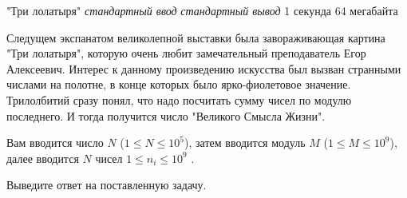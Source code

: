 \begin{problem}%
{"Три лолатыря"}%
{\textsl{стандартный ввод}}%
{\textsl{стандартный вывод}}%
{1 секунда}%
{64 мегабайта}{}

Следущем экспанатом великолепной выставки была завораживающая картина "Три лолатыря", которую очень любит замечательный преподаватель Егор Алексеевич. Интерес к данному произведению искусства был вызван странными числами на полотне, в конце которых было ярко-фиолетовое значение. Трилолбитий сразу понял, что надо посчитать сумму чисел по модулю последнего. И тогда получится число "Великого Смысла Жизни". 

\InputFile

Вам вводится число $N$ ($1 \le N \le 10^5$), затем вводится модуль $M$ ($1 \le M \le 10^9$), далее вводится $N$ чисел $1 \le n_i \le 10^9$ .

\OutputFile

Выведите ответ на поставленную задачу.

\Examples

\begin{example}
%
\end{example}
\end{problem}
